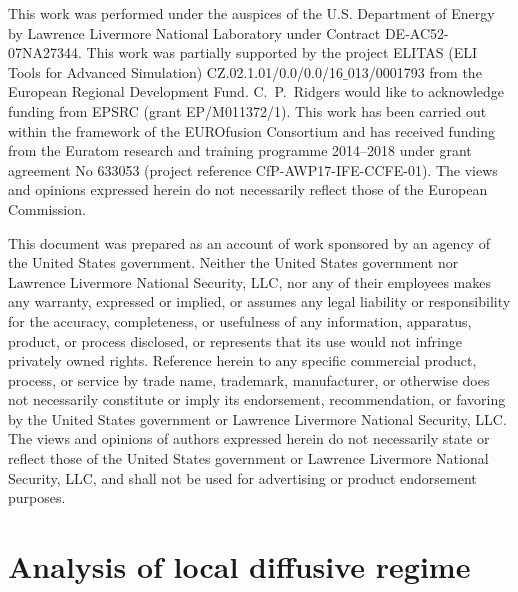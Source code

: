 \documentclass[
 aps,
 jmp,
 amsmath,amssymb,
 twocolumn,
]{revtex4-1}
\begin{document}
\begin{acknowledgments}
This work was performed under the auspices of the U.S. Department of Energy by Lawrence Livermore National Laboratory under Contract DE-AC52-07NA27344.
This work was partially supported by the project ELITAS (ELI Tools for Advanced Simulation) CZ.02.1.01/0.0/0.0/16$\_$013/0001793 from the European Regional Development Fund.
C.~P.~Ridgers would like to acknowledge funding from EPSRC (grant EP/M011372/1). This work has been carried out within the framework of the EUROfusion Consortium and has received funding from the Euratom research and training programme 2014–2018 under grant agreement No 633053 (project reference CfP-AWP17-IFE-CCFE-01). The views and opinions expressed herein do not necessarily reflect those of the European Commission.

This document was prepared as an account of work sponsored by an agency of the United States government. Neither the United States government nor Lawrence Livermore National Security, LLC, nor any of their employees makes any warranty, expressed or implied, or assumes any legal liability or responsibility for the accuracy, completeness, or usefulness of any information, apparatus, product, or process disclosed, or represents that its use would not infringe privately owned rights. Reference herein to any specific commercial product, process, or service by trade name, trademark, manufacturer, or otherwise does not necessarily constitute or imply its endorsement, recommendation, or favoring by the United States government or Lawrence Livermore National Security, LLC. The views and opinions of authors expressed herein do not necessarily state or reflect those of the United States government or Lawrence Livermore National Security, LLC, and shall not be used for advertising or product endorsement purposes.
\end{acknowledgments}

\appendix
\section{Analysis of local diffusive regime}
\label{app:DiffusiveKinetics}
\end{document}
